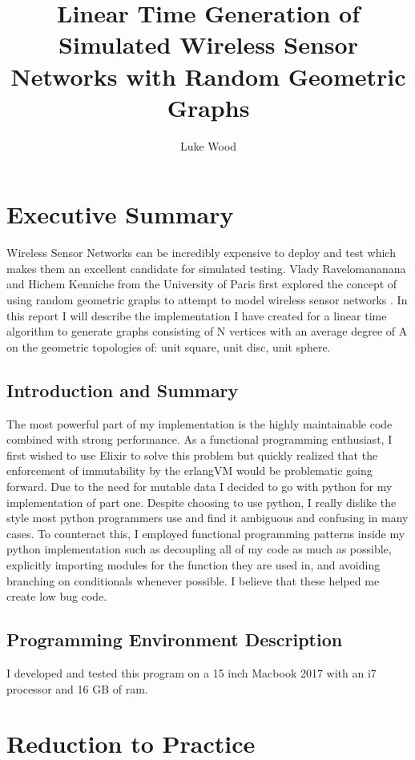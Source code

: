 \documentclass{article}
\begin{document}
  \title{Linear Time Generation of Simulated Wireless Sensor Networks with Random Geometric Graphs}
  \author{Luke Wood}
  \maketitle

  \section{Executive Summary}
	Wireless Sensor Networks can be incredibly expensive to deploy and test which makes them an excellent candidate for simulated testing.
	Vlady Ravelomananana and Hichem Kenniche from the University of Paris first explored the concept of using random geometric graphs to attempt to model wireless sensor networks \cite{kenniche2010random}.
	In this report I will describe the implementation I have created for a linear time algorithm to generate graphs consisting of N vertices with an average degree of A on the geometric topologies of: unit square, unit disc, unit sphere.
  \subsection{Introduction and Summary}
	The most powerful part of my implementation is the highly maintainable code combined with strong performance.
	As a functional programming enthusiast, I first wished to use Elixir to solve this problem but quickly realized that the enforcement of immutability by the erlangVM would be problematic going forward.
	Due to the need for mutable data I decided to go with python for my implementation of part one.
	Despite choosing to use python, I really dislike the style most python programmers use and find it ambiguous and confusing in many cases.
	To counteract this, I employed functional programming patterns inside my python implementation such as decoupling all of my code as much as possible, explicitly importing modules for the function they are used in, and avoiding branching on conditionals whenever possible.
	I believe that these helped me create low bug code.
  \subsection{Programming Environment Description}
	I developed and tested this program on a 15 inch Macbook 2017 with an i7 processor and 16 GB of ram.
  \section{Reduction to Practice}
\end{document}
